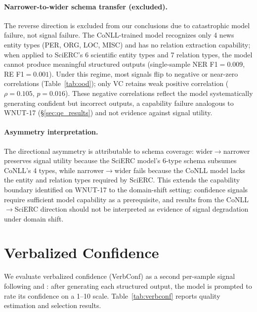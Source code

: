 \paragraph{Narrower-to-wider schema transfer (excluded).}
The reverse direction is excluded from our conclusions due to catastrophic model failure, not signal failure.
The CoNLL-trained model recognizes only 4 news entity types (PER, ORG, LOC, MISC) and has no relation extraction capability; when applied to SciERC's 6 scientific entity types and 7 relation types, the model cannot produce meaningful structured outputs (single-sample NER F1${=}0.009$, RE F1${=}0.001$).
Under this regime, most signals flip to negative or near-zero correlations (Table~\ref{tab:ood}); only VC retains weak positive correlation ($\rho{=}0.105$, $p{=}0.016$).
These negative correlations reflect the model systematically generating confident but incorrect outputs, a capability failure analogous to WNUT-17 (\S\ref{sec:qe_results}) and not evidence against signal utility.

\paragraph{Asymmetry interpretation.}
The directional asymmetry is attributable to schema coverage: wider$\to$narrower preserves signal utility because the SciERC model's 6-type schema subsumes CoNLL's 4 types, while narrower$\to$wider fails because the CoNLL model lacks the entity and relation types required by SciERC.
This extends the capability boundary identified on WNUT-17 to the domain-shift setting: confidence signals require sufficient model capability as a prerequisite, and results from the CoNLL$\to$SciERC direction should not be interpreted as evidence of signal degradation under domain shift.

\section{Verbalized Confidence}\label{app:verbalized_confidence}

We evaluate verbalized confidence (VerbConf) as a second per-sample signal following \citet{lin2022teaching} and \citet{tian2023calibration}: after generating each structured output, the model is prompted to rate its confidence on a 1--10 scale.
Table~\ref{tab:verbconf} reports quality estimation and selection results.

